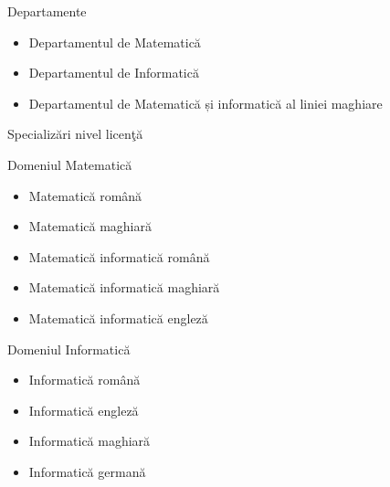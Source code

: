 \documentclass[aspectratio=169]{beamer}
\newcommand\Facultate{Facultatea de Matematic\u{a} \c{s}i Informatic\u{a}}
\begin{document}
\renewcommand*\sectionTitle{Departamente}
\renewcommand*\sectionSubtitle{\Facultate}


\begin{frame}{Departamente}
\begin{itemize}
    \item Departamentul de Matematic\u{a}
    \item Departamentul de Informatic\u{a}
    \item Departamentul de Matematic\u{a} și informatic\u{a} al liniei maghiare
\end{itemize}
\end{frame}

\renewcommand*\sectionTitle{Specializ\u{a}ri}
\renewcommand*\sectionSubtitle{\Facultate}


\begin{frame}{Specializ\u{a}ri nivel licen\c{t}\u{a}}
\begin{minipage}[t]{0.48\linewidth}
\begin{block}{\centering Domeniul Matematic\u{a}}
        \begin{itemize}
            \item Matematic\u{a} rom\^{a}n\u{a}
            \item Matematic\u{a} maghiar\u{a}
            \item Matematic\u{a} informatic\u{a} rom\^{a}n\u{a}
            \item Matematic\u{a} informatic\u{a} maghiar\u{a}
            \item Matematic\u{a} informatic\u{a} englez\u{a}
        \end{itemize}
\end{block}        
 \end{minipage}
  \hspace{0.08\textwidth}%
 \begin{minipage}[t]{0.42\linewidth}
\begin{block}{\centering Domeniul Informatic\u{a}}        
        \begin{itemize}
            \item Informatic\u{a} rom\^{a}n\u{a}
            \item Informatic\u{a} englez\u{a}
            \item Informatic\u{a} maghiar\u{a}
            \item Informatic\u{a} german\u{a}
        \end{itemize}
 
 \end{block}        
\end{minipage}
\end{frame}
\end{document}
